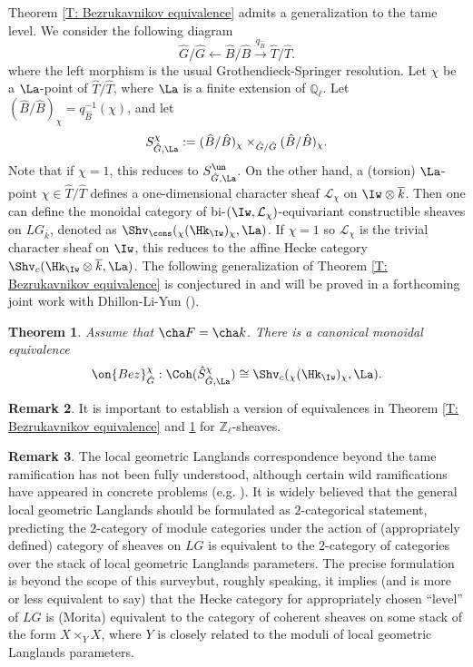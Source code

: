\documentclass[11pt]{amsart}
\newtheorem{thm}{Theorem}[subsection]
\theoremstyle{definition}
\theoremstyle{definition}
\newtheorem{rmk}[thm]{Remark}
\theoremstyle{definition}
\numberwithin{equation}{section}
\newcommand{\bQ}{{\mathbb Q}}
\newcommand{\bZ}{{\mathbb Z}}
\newcommand{\mL}{{\mathcal L}}
\begin{document}
Theorem \ref{T: Bezrukavnikov equivalence} admits a generalization to the tame level.  
We consider the following diagram
\[
\hat{G}/\hat{G}\leftarrow \hat{B}/\hat{B}\xrightarrow{q_{\hat{B}}} \hat{T}/\hat{T}.
\]
where the left morphism is the usual Grothendieck-Springer resolution.
Let $\chi$ be a $\La$-point of $\hat{T}/\hat{T}$, where $\La$ is a finite extension of $\bQ_\ell$. Let $(\hat{B}/\hat{B})_\chi=q_{\hat{B}}^{-1}(\chi)$, and let
\[
S^{\chi}_{\hat{G},\La}:= (\hat{B}/\hat{B})_\chi\times_{\hat{G}/\hat{G}} (\hat{B}/\hat{B})_\chi.
\]
Note that if $\chi=1$, this reduces to $S^{\un}_{\hat{G},\La}$.
On the other hand, a (torsion) $\La$-point $\chi\in \hat{T}/\hat{T}$ defines a one-dimensional character sheaf $\mL_\chi$ on $\Iw\otimes\overline{k}$.  Then one can define the monoidal category of bi-$(\Iw,\mL_\chi)$-equivariant constructible sheaves on $LG_{\bar k}$, denoted as $\Shv_{\cons}({}_\chi(\Hk_{\Iw})_{\chi},\La)$. If $\chi=1$ so $\mL_\chi$ is the trivial character sheaf on $\Iw$, this reduces to the affine Hecke category $\Shv_c(\Hk_{\Iw}\otimes\overline k,\La)$.
The following generalization of Theorem \ref{T: Bezrukavnikov equivalence} is conjectured in \cite{Bezrukavnikov-Affine-Hecke} and will be proved in a forthcoming joint work with Dhillon-Li-Yun (\cite{DLYZ-Endoscopy}).

\begin{thm} \label{T: Monodromic Bezrukavnikov equivalence}
Assume that $\cha F=\cha k$. There is a canonical monoidal equivalence
\[
\on{Bez}^{\chi}_{\hat{G}}: \Coh(\hat{S}_{\hat{G},\La}^{\chi})\cong \Shv_{c}({}_\chi(\Hk_{\Iw})_{\chi},\La).
\]
\end{thm}

\begin{rmk}\label{R: int Bez}
It is important to establish a version of equivalences in Theorem \ref{T: Bezrukavnikov equivalence} and \ref{T: Monodromic Bezrukavnikov equivalence} for $\bZ_\ell$-sheaves.
\end{rmk}

\begin{rmk}\label{2-categorical LGL}
The local geometric Langlands correspondence beyond the tame ramification has not been fully understood, although certain wild ramifications have appeared in concrete problems (e.g. \cite{HNY-Kloosterman, Zhu-FG-vs-HNY}).
It is widely believed that the general local geometric Langlands
should be formulated as $2$-categorical statement, predicting the $2$-category of module categories under the action of (appropriately defined) category of sheaves on $LG$ is equivalent to the $2$-category of categories over the stack of local geometric Langlands parameters. The precise formulation is beyond the scope of this surveybut, roughly speaking, it implies (and is more or less equivalent to say) that the Hecke category for appropriately chosen ``level'' of $LG$ is (Morita) equivalent to the category of coherent sheaves on some stack of the form $X\times_{Y}X$, where $Y$ is closely related to the moduli of local geometric Langlands parameters. 
\end{rmk}
\end{document}
